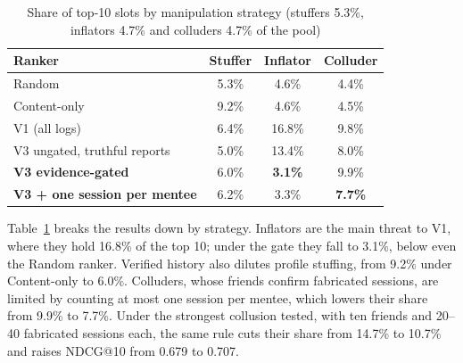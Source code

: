 \documentclass[12pt,a4paper]{report}
\begin{document}
\begin{table}[h]
\centering
\caption{Share of top-10 slots by manipulation strategy (stuffers 5.3\%, inflators 4.7\% and colluders 4.7\% of the pool)}
\label{tab:attack}
\small
\begin{tabular}{lccc}
\toprule
\textbf{Ranker} & \textbf{Stuffer} & \textbf{Inflator} & \textbf{Colluder}\\
\midrule
Random & 5.3\% & 4.6\% & 4.4\%\\
Content-only & 9.2\% & 4.6\% & 4.5\%\\
V1 (all logs) & 6.4\% & 16.8\% & 9.8\%\\
V3 ungated, truthful reports & 5.0\% & 13.4\% & 8.0\%\\
\textbf{V3 evidence-gated} & 6.0\% & \textbf{3.1\%} & 9.9\%\\
\textbf{V3 + one session per mentee} & 6.2\% & 3.3\% & \textbf{7.7\%}\\
\bottomrule
\end{tabular}
\end{table}

Table~\ref{tab:attack} breaks the results down by strategy. Inflators are the main threat to V1, where they hold 16.8\% of the top 10; under the gate they fall to 3.1\%, below even the Random ranker. Verified history also dilutes profile stuffing, from 9.2\% under Content-only to 6.0\%. Colluders, whose friends confirm fabricated sessions, are limited by counting at most one session per mentee, which lowers their share from 9.9\% to 7.7\%. Under the strongest collusion tested, with ten friends and 20--40 fabricated sessions each, the same rule cuts their share from 14.7\% to 10.7\% and raises NDCG@10 from 0.679 to 0.707.
\end{document}
